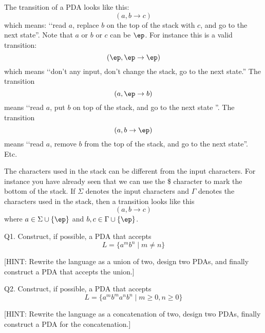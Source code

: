 


\renewcommand\TITLE{Assignment 22}
\renewcommand\AUTHOR{John Doe}
\renewcommand\EMAIL{jdoe@jdoe.com}


\topmatter


The transition of a PDA looks like this:
\[
(a, b \rightarrow c)
\]
which means: \lq\lq read $a$, replace $b$ on the top of the stack with 
$c$, and go to the next state''.
Note that $a$ or $b$ or $c$ can be $\ep$.
For instance this is a valid transition:
\[
(\ep, \ep \rightarrow \ep)
\]
which means \lq\lq don't any input, don't change the stack, go to the 
next state.''
The transition
\[
(a, \ep \rightarrow b)
\]
means \lq\lq  read $a$, put $b$ on top of the stack, and go to the next state
''.
The transition
\[
(a, b \rightarrow \ep)
\]
means \lq\lq  read $a$, remove $b$ from the top of the stack, and go to the 
next state''.
Etc.


The characters used in the stack can be different from the 
input characters.
For instance you have already seen that we can use the \$ character to mark
the bottom of the stack.
If $\Sigma$ denotes the input characters and $\Gamma$ denotes the 
characters used in the stack, then
a transition looks like this
\[
(a, b \rightarrow c)
\]
where $a \in \Sigma \cup \{\ep\}$ and $b,c \in \Gamma \cup \{\ep\}$.

\newpage 

Q1. Construct, if possible, a PDA that accepts
\[
L = \{a^m b^n \mid m \neq n\}
\]

[HINT: Rewrite the language as a union of two, design two PDAs, and
finally construct a PDA that accepts the union.]

\SOLUTION

\newpage



Q2. Construct, if possible, a PDA that accepts
\[
L = \{a^m b^m a^n b^n \mid m \geq 0, n \geq 0\}
\]

[HINT: Rewrite the language as a concatenation of two,
design two PDAs, finally construct a PDA for the concatenation.]


\SOLUTION



\newpage







